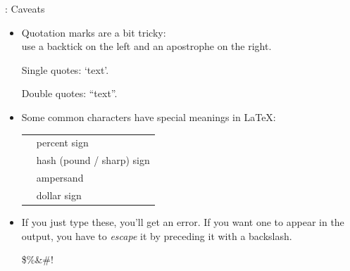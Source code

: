 \documentclass[aspectratio=169]{beamer}
\begin{document}
\begin{frame}[fragile]{\insertsubsection{}: Caveats}
\small
\begin{itemize}
\item Quotation marks are a bit tricky:\\
use a backtick \keystroke{\`{}} on the left and an apostrophe \keystroke{\'{}} on the right.
\begin{exampletwouptiny}
Single quotes: `text'.

Double quotes: ``text''.
\end{exampletwouptiny}

\item Some common characters have special meanings in \LaTeX:\\[1ex]
\begin{tabular}{cl}
\keystrokebftt{\%} & percent sign              \\
\keystrokebftt{\#} & hash (pound / sharp) sign \\
\keystrokebftt{\&} & ampersand                 \\
\keystrokebftt{\$} & dollar sign               \\
\end{tabular}
\item If you just type these, you'll get an error. If you want one to appear in
the output, you have to \emph{escape} it by preceding it with a backslash.
\begin{exampletwoup}
\$\%\&\#!
\end{exampletwoup}
\end{itemize}
\end{frame}
\end{document}
